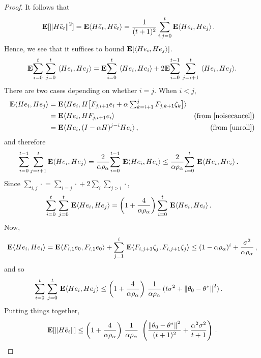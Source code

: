 \begin{proof}
It follows that 
\begin{align*}
\E[\norm{H\eb_t}^2]&=\E\ip{H\eb_t,H\eb_t}
 =\frac{1}{(t+1)^2} \sum_{i,j=0}^t \E\ip{H e_i,He_j}\,.
\end{align*}
Hence, we see that it suffices to bound $\EE{\ip{H e_i, H e_j }}$.
\begin{align*}
\E\ous{\sum}{i=0}{t}\ous{\sum}{j=0}{t}\ip{He_i,He_j}=\E\ous{\sum}{i=0}{t}\ip{He_i,He_i}+ 2\E\ous{\sum}{i=0}{t-1}\ous{\sum}{j=i+1}{t}\ip{He_i,He_j}.
\end{align*}
\fi
There are two cases depending on whether $i=j$. When $i< j$,
\begin{align*}
\E\ip{He_i,He_j}
&=\E \ip{He_i,H\big[F_{j,i+1} e_i+\alpha\textstyle\sum_{k=i+1}^j F_{j,k+1}\zeta_{k}\big]}\\
&=\E\ip{He_i,H F_{j,i+1} e_i} & \text{(from \Cref{noisecancel})}\\
&=\E\ip{He_i,(I-\alpha H)^{j-i}H e_i}\,, &\text{(from \Cref{unroll})}
\end{align*}
and therefore
\begin{align*}
\label{inter}
\sum_{i=0}^{t-1}\sum_{j=i+1}^t \E\ip{ He_i,H e_j}
&=\frac2{\alpha\rho_{\alpha}} \ous{\sum}{i=0}{t-1}\E\ip{He_i,H e_i}
\leq \frac2{\alpha\rho_{\alpha}}\ous{\sum}{i=0}{t}\E\ip{He_i,H e_i}\,.
\end{align*}
Since $\sum_{i,j}\cdot{} = \sum_{i=j}\cdot{} + 2 \sum_i \sum_{j>i} \cdot{}$,
\begin{align*}
\ous{\sum}{i=0}{t}\ous{\sum}{j=0}{t} \E\ip{He_i,He_j}&= \left(1+\frac4{\alpha\rho_{\alpha}}\right)\ous{\sum}{i=0}{t}\E\ip{He_i,He_i}\,.
\end{align*}
Now, 
\begin{align*}
\E\ip{He_i,He_i}=\E\ip{F_{i,1}e_0,F_{i,1}e_0}+\ous{\sum}{j=1}{i}\E\ip{F_{i,j+1}\zeta_j,F_{i,j+1}\zeta_j}
\leq (1-\alpha\rho_{\alpha})^i+ \frac{\sigma^2}{\alpha \rho_\alpha}\,,
\end{align*}
and so
\begin{align*}
\ous{\sum}{i=0}{t}\ous{\sum}{j=0}{t} \E\ip{He_i,He_j}
&\leq \left(1+\frac4{\alpha\rho_{\alpha}}\right)\, \frac1{\alpha\rho_{\alpha}}\, (t\sigma^2+\norm{\theta_0-\ts}^2)\,.
\end{align*}
Putting things together,
\begin{align}
\E[\norm{H\eb_t}]
\leq \left(1+\frac4{\alpha\rho_{\alpha}}\right)\, \frac1{\alpha\rho_{\alpha}}\, \,
		\left(\frac{\norm{\theta_0-\ts}^2}{(t+1)^2}+ \frac{\alpha^2\sigma^2}{t+1} \right)\,.
\end{align}
\end{proof}

